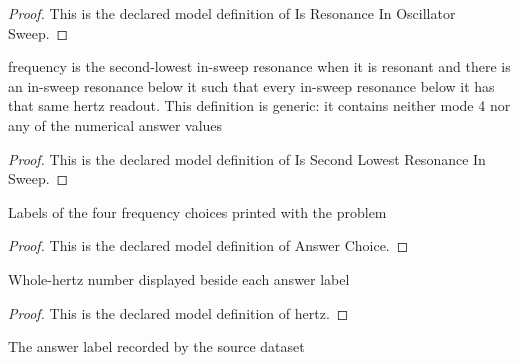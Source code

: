 \begin{proof}
  This is the declared model definition of Is Resonance In Oscillator Sweep.
\end{proof}
\begin{definition}
  \label{def:physics:phyx-mini-0318:phyxminiproblems-problemphyxmini0318-issecondlowestresonanceinsweep}
  frequency is the second-lowest in-sweep resonance when it is resonant and there is an in-sweep resonance below it such that every in-sweep resonance below it has that same hertz readout. This definition is generic: it contains neither mode 4 nor any of the numerical answer values
\end{definition}
\begin{proof}
  This is the declared model definition of Is Second Lowest Resonance In Sweep.
\end{proof}
\begin{definition}
  \label{def:physics:phyx-mini-0318:phyxminiproblems-problemphyxmini0318-answerchoice}
  Labels of the four frequency choices printed with the problem
\end{definition}
\begin{proof}
  This is the declared model definition of Answer Choice.
\end{proof}
\begin{definition}[hertz]
  \label{def:physics:phyx-mini-0318:phyxminiproblems-problemphyxmini0318-answerchoice-hertz}
  Whole-hertz number displayed beside each answer label
\end{definition}
\begin{proof}
  This is the declared model definition of hertz.
\end{proof}
\begin{definition}
  \label{def:physics:phyx-mini-0318:phyxminiproblems-problemphyxmini0318-recordeddatasetanswer}
  The answer label recorded by the source dataset
\end{definition}
